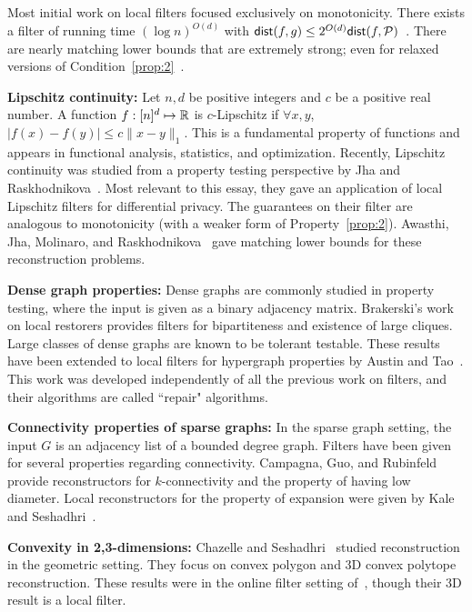 \documentclass[natbib]{svcyclop}
\def\dist{{\sf dist}}
\begin{document}
Most initial work on local filters focused exclusively on monotonicity.
There exists a filter of running
time $(\log n)^{O(d)}$ with $\dist(f,g) \leq 2^{O(d)}\dist(f,\cP)$~\cite{SS06}.
There are nearly matching lower bounds that are extremely strong; even for relaxed versions of Condition~\ref{prop:2}~\cite{AwJh+12}.

{\bf Lipschitz continuity:} Let $n,d$ be positive integers and $c$ be a positive real number. A function $f:[n]^d \mapsto \mathbb{R}$ is $c$-Lipschitz
if $\forall x,y$, $|f(x) - f(y)| \leq c\|x-y\|_1$. This is a fundamental property
of functions and appears in functional analysis, statistics, and optimization.
Recently, Lipschitz continuity was studied from a property testing perspective by Jha and Raskhodnikova~\cite{JhRa13}.
Most relevant to this essay, they gave an application of local Lipschitz filters
for differential privacy. The guarantees on their filter are analogous to monotonicity
(with a weaker form of Property~\ref{prop:2}). Awasthi, Jha, Molinaro, and Raskhodnikova~\cite{AwJh+12}
gave matching lower bounds for these reconstruction problems.
%

{\bf Dense graph properties:} Dense graphs are commonly studied in property testing, where
the input is given as a binary adjacency matrix. Brakerski's work on local restorers provides
filters for bipartiteness and existence of large cliques. Large classes of dense graphs are known
to be tolerant testable. These results have been extended to local filters
for hypergraph properties by Austin and Tao~\cite{AT09}. This work was developed independently
of all the previous work on filters, and their algorithms are called ``repair"
algorithms.

{\bf Connectivity properties of sparse graphs:} In the sparse graph setting, the input $G$
is an adjacency list of a bounded degree graph. Filters have been given for several properties regarding connectivity.
Campagna, Guo, and Rubinfeld~\cite{CaGuRu13} provide reconstructors for $k$-connectivity and the property
of having low diameter.
Local reconstructors for the property of expansion were given by Kale and Seshadhri~\cite{KalS11-j}.

{\bf Convexity in 2,3-dimensions:} 
Chazelle and Seshadhri~\cite{ChSe11-j} studied reconstruction in the geometric setting. They focus
on convex polygon and 3D convex polytope reconstruction. These results were in the online filter
setting of~\cite{ACCL2}, though their 3D result is a local filter. 
\end{document}
